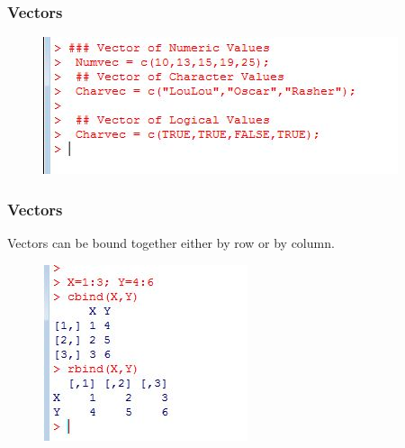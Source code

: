\documentclass{beamer}
\begin{document}
 	\begin{frame}
 		\frametitle{Vectors}
 		\begin{figure}
 			\centering
 			\includegraphics[width=1.2\linewidth]{images/makevectors}
 		\end{figure}
 		
 	\end{frame}
 	\begin{frame}
 		\frametitle{Vectors} 
 		Vectors can be bound together either by row or by column.
 		\begin{figure}
 			\centering
 			\includegraphics[width=1.2\linewidth]{images/cbindrbind}
 		\end{figure}
 		
 	\end{frame}
\end{document}
